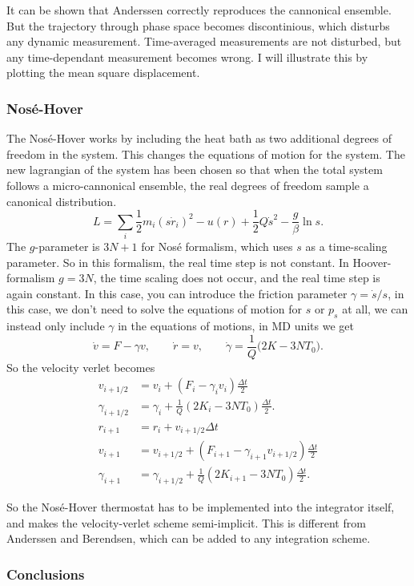\documentclass[a4paper, 11pt, notitlepage, english]{article}
\begin{document}
It can be shown that Anderssen correctly reproduces the cannonical ensemble. But the trajectory through phase space becomes discontinious, which disturbs any dynamic measurement. Time-averaged measurements are not disturbed, but any time-dependant measurement becomes wrong. I will illustrate this by plotting the mean square displacement.

\subsubsection*{Nosé-Hover}

The Nosé-Hover works by including the heat bath as two additional degrees of freedom in the system. This changes the equations of motion for the system. The new lagrangian of the system has been chosen so that when the total system follows a micro-cannonical ensemble, the real degrees of freedom sample a canonical distribution.
$$L = \sum_i \frac{1}{2}m_i(s\dot{r}_i)^2 - u(r) + \frac{1}{2}Q\dot{s}^2 - \frac{g}{\beta}\ln s.$$
The $g$-parameter is $3N+1$ for Nosé formalism, which uses $s$ as a time-scaling parameter. So in this formalism, the real time step is not constant. In Hoover-formalism $g = 3N$, the time scaling does not occur, and the real time step is again constant. In this case, you can introduce the friction parameter $\gamma = \dot{s}/s$, in this case, we don't need to solve the equations of motion for $s$ or $p_s$ at all, we can instead only include $\gamma$ in the equations of motions, in MD units we get
$$\dot{v} = F - \gamma v, \qquad \dot{r} = v, \qquad \dot{\gamma} = \frac{1}{Q}\bigg(2K - 3NT_0\bigg).$$
So the velocity verlet becomes
\begin{align*}
v_{i+1/2} &= v_{i} + (F_i - \gamma_i v_i)\frac{\Delta t}{2} \\
\gamma_{i+1/2} &= \gamma_i + \frac{1}{Q}(2K_i - 3NT_0)\frac{\Delta t}{2}. \\
r_{i+1} &= r_{i} + v_{i+1/2}\Delta t \\
v_{i+1} &= v_{i+1/2} + (F_{i+1} - \gamma_{i+1} v_{i+1/2})\frac{\Delta t}{2} \\
\gamma_{i+1} &= \gamma_{i+1/2} + \frac{1}{Q}(2K_{i+1} - 3NT_0)\frac{\Delta t}{2}.	
\end{align*}

So the Nosé-Hover thermostat has to be implemented into the integrator itself, and makes the velocity-verlet scheme semi-implicit. This is different from Anderssen and Berendsen, which can be added to any integration scheme.

\subsubsection*{Conclusions}
\end{document}
